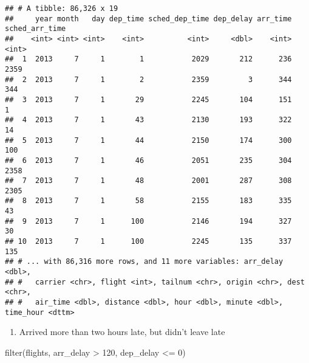 \documentclass[
]{article}
\newenvironment{Shaded}{\begin{snugshade}}{\end{snugshade}}
\newcommand{\DecValTok}[1]{\textcolor[rgb]{0.00,0.00,0.81}{#1}}
\newcommand{\FunctionTok}[1]{\textcolor[rgb]{0.00,0.00,0.00}{#1}}
\newcommand{\NormalTok}[1]{#1}
\newcommand{\SpecialCharTok}[1]{\textcolor[rgb]{0.00,0.00,0.00}{#1}}
\providecommand{\tightlist}{%
  \setlength{\itemsep}{0pt}\setlength{\parskip}{0pt}}
\begin{document}
\begin{verbatim}
## # A tibble: 86,326 x 19
##     year month   day dep_time sched_dep_time dep_delay arr_time sched_arr_time
##    <int> <int> <int>    <int>          <int>     <dbl>    <int>          <int>
##  1  2013     7     1        1           2029       212      236           2359
##  2  2013     7     1        2           2359         3      344            344
##  3  2013     7     1       29           2245       104      151              1
##  4  2013     7     1       43           2130       193      322             14
##  5  2013     7     1       44           2150       174      300            100
##  6  2013     7     1       46           2051       235      304           2358
##  7  2013     7     1       48           2001       287      308           2305
##  8  2013     7     1       58           2155       183      335             43
##  9  2013     7     1      100           2146       194      327             30
## 10  2013     7     1      100           2245       135      337            135
## # ... with 86,316 more rows, and 11 more variables: arr_delay <dbl>,
## #   carrier <chr>, flight <int>, tailnum <chr>, origin <chr>, dest <chr>,
## #   air_time <dbl>, distance <dbl>, hour <dbl>, minute <dbl>, time_hour <dttm>
\end{verbatim}

\begin{enumerate}
\def\labelenumi{\arabic{enumi}.}
\setcounter{enumi}{4}
\tightlist
\item
  Arrived more than two hours late, but didn't leave late
\end{enumerate}

\begin{Shaded}
\begin{Highlighting}[]
\FunctionTok{filter}\NormalTok{(flights, arr\_delay }\SpecialCharTok{\textgreater{}} \DecValTok{120}\NormalTok{, dep\_delay }\SpecialCharTok{\textless{}=} \DecValTok{0}\NormalTok{)}
\end{Highlighting}
\end{Shaded}
\end{document}
